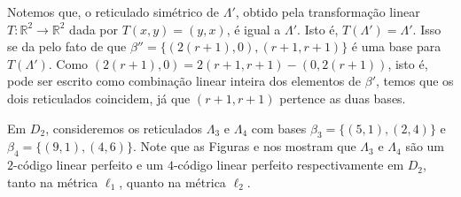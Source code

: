 \documentclass{article}
\theoremstyle{plain}
\theoremstyle{definition}
\theoremstyle{remark}
\begin{document}
  Notemos que, o reticulado simétrico de $\Lambda'$, obtido pela transformação linear $T: \mathbb{R}^2 \to \mathbb{R}^2$ dada por $T(x,y) = (y,x)$, é igual a $\Lambda'$. Isto é, $T(\Lambda') = \Lambda'$. Isso se da pelo fato de que $\beta''=\{(2(r+1),0),(r+1,r+1)\}$ é uma base para $T(\Lambda')$. Como $(2(r+1),0) = 2(r+1,r+1)-(0,2(r+1))$, isto é, pode ser escrito como combinação linear inteira dos elementos de $\beta'$, temos que os dois reticulados coincidem, já que $(r+1,r+1)$ pertence as duas bases. 

  Em $D_2$, consideremos os reticulados $\Lambda_3$ e $\Lambda_4$ com bases $\beta_3 = \{(5,1),(2,4)\}$ e $\beta_4 = \{(9,1),(4,6)\}$. Note que as Figuras e nos mostram que $\Lambda_3$ e $\Lambda_4$ são um $2$-código linear perfeito e um $4$-código linear perfeito respectivamente em $D_2$, tanto na métrica $\ell_1$, quanto na métrica $\ell_2$.
  
\end{document}
